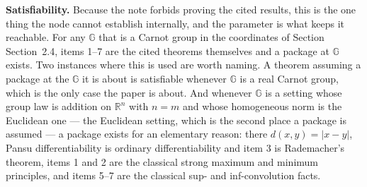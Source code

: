 \begin{definition}
\medskip\noindent\textbf{Satisfiability.} Because the note forbids proving the cited results,
this is the one thing the node cannot establish internally, and the parameter is what keeps
it reachable. For any $\mathbb G$ that is a Carnot group in the coordinates of Section
Section~2.4, items 1--7 are the cited theorems themselves and a package at $\mathbb G$
exists. Two instances where this is used are worth naming. A theorem assuming a package at
the $\mathbb G$ it is about is satisfiable whenever $\mathbb G$ is a real Carnot group, which
is the only case the paper is about. And whenever $\mathbb G$ is a setting whose group law is
addition on $\mathbb R^{n}$ with $n=m$ and whose homogeneous norm is the Euclidean one --- the
Euclidean setting, which is the second place a package is assumed --- a package exists for an
elementary reason: there $d(x,y)=|x-y|$, Pansu differentiability is
ordinary differentiability and item 3 is Rademacher's theorem, items 1 and 2 are the classical
strong maximum and minimum principles, and items 5--7 are the classical sup- and
inf-convolution facts.
\end{definition}
